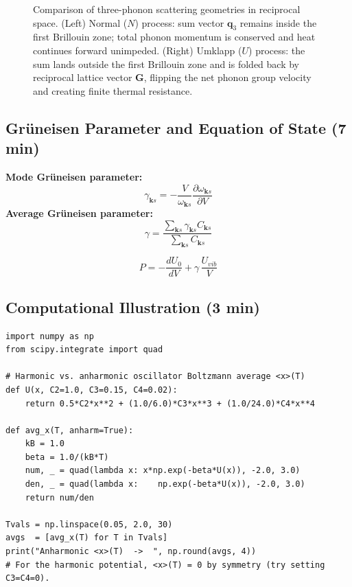 \documentclass[11pt,a4paper]{article}
\begin{document}
\begin{figure}[htbp]
\caption{Comparison of three-phonon scattering geometries in reciprocal space. (Left) Normal ($N$) process: sum vector $\mathbf{q}_3$ remains inside the first Brillouin zone; total phonon momentum is conserved and heat continues forward unimpeded. (Right) Umklapp ($U$) process: the sum lands outside the first Brillouin zone and is folded back by reciprocal lattice vector $\mathbf{G}$, flipping the net phonon group velocity and creating finite thermal resistance.}
\label{fig:normal_vs_umklapp_scattering}
\end{figure}

\subsection{Gr\"uneisen Parameter and Equation of State \hfill \small(7 min)}

\textbf{Mode Gr\"uneisen parameter:}
\[
\gamma_{\mathbf ks} = -\frac{V}{\omega_{\mathbf ks}}\frac{\partial\omega_{\mathbf ks}}{\partial V}
\]
\textbf{Average Gr\"uneisen parameter:}
\[
\gamma = \frac{\sum_{\mathbf ks}\gamma_{\mathbf ks}C_{\mathbf ks}}{\sum_{\mathbf ks}C_{\mathbf ks}}
\]
\begin{keybox}
\[
P = -\frac{dU_0}{dV} + \gamma\,\frac{U_{vib}}{V}
\]
\end{keybox}

\subsection{Computational Illustration \hfill \small(3 min)}

\begin{pybox}
\begin{lstlisting}
import numpy as np
from scipy.integrate import quad

# Harmonic vs. anharmonic oscillator Boltzmann average <x>(T)
def U(x, C2=1.0, C3=0.15, C4=0.02):
    return 0.5*C2*x**2 + (1.0/6.0)*C3*x**3 + (1.0/24.0)*C4*x**4

def avg_x(T, anharm=True):
    kB = 1.0
    beta = 1.0/(kB*T)
    num, _ = quad(lambda x: x*np.exp(-beta*U(x)), -2.0, 3.0)
    den, _ = quad(lambda x:    np.exp(-beta*U(x)), -2.0, 3.0)
    return num/den

Tvals = np.linspace(0.05, 2.0, 30)
avgs  = [avg_x(T) for T in Tvals]
print("Anharmonic <x>(T)  ->  ", np.round(avgs, 4))
# For the harmonic potential, <x>(T) = 0 by symmetry (try setting C3=C4=0).
\end{lstlisting}
\end{pybox}
\end{document}
